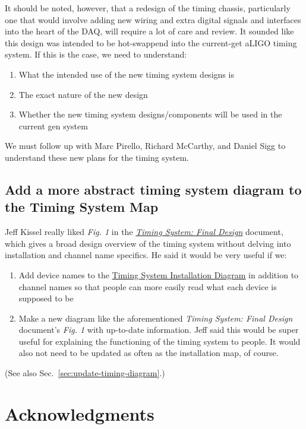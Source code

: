 \documentclass{article}
\newcommand*{\TODO}{\textcolor{todo}}
\begin{document}
It should be noted, however, that a redesign of the timing chassis, particularly one that would involve adding new wiring and extra digital signals and interfaces into the heart of the DAQ, will require a lot of care and review. It sounded like this design was intended to be hot-swappend into the current-get aLIGO timing system. If this is the case, we need to understand:

\begin{enumerate}
    \item What the intended use of the new timing system designs is
    \item The exact nature of the new design
    \item Whether the new timing system designs/components will be used in the current gen system
\end{enumerate}

\TODO{We must follow up with Marc Pirello, Richard McCarthy, and Daniel Sigg to understand these new plans for the timing system.}

\subsection{Add a more abstract timing system diagram to the Timing System Map}

Jeff Kissel really liked \textit{Fig. 1} in the \textit{\href{https://dcc.ligo.org/LIGO-T070173}{Timing System: Final Design}} document, which gives a broad design overview of the timing system without delving into installation and channel name specifics. He said it would be very useful if we:

\begin{enumerate}
    \item{\TODO{Add device names} to the \href{https://dcc.ligo.org/LIGO-D1500201}{Timing System Installation Diagram} in addition to channel names so that people can more easily read what each device is supposed to be}
    \item{\TODO{Make a new diagram like the aforementioned \textit{Timing System: Final Design} document's \textit{Fig. 1} with up-to-date information}. Jeff said this would be super useful for explaining the functioning of the timing system to people. It would also not need to be updated as often as the installation map, of course.}
\end{enumerate}

(See also Sec.~\ref{sec:update-timing-diagram}.)

\section{Acknowledgments}
\end{document}
